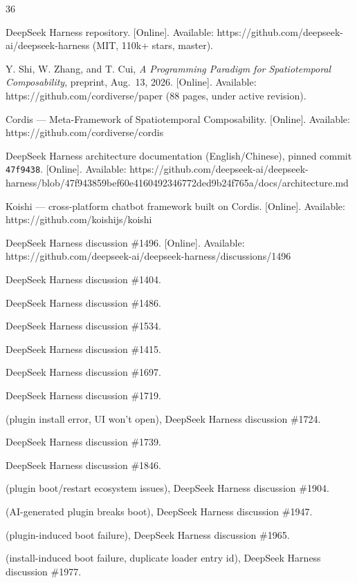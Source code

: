 \documentclass[11pt]{article}
\begin{document}
\begin{thebibliography}{36}

 DeepSeek Harness repository. [Online]. Available:
https://github.com/deepseek-ai/deepseek-harness (MIT, 110k+ stars,
master).

 Y. Shi, W. Zhang, and T. Cui, \emph{A Programming Paradigm for
Spatiotemporal Composability}, preprint, Aug.~13, 2026. [Online].
Available: https://github.com/cordiverse/paper (88 pages, under active
revision).

 Cordis --- Meta-Framework of Spatiotemporal Composability.
[Online]. Available: https://github.com/cordiverse/cordis

 DeepSeek Harness architecture documentation (English/Chinese),
pinned commit \texttt{47f9438}. [Online]. Available:
https://github.com/deepseek-ai/deepseek-harness/blob/47f943859bef60e4160492346772ded9b24f765a/docs/architecture.md

 Koishi --- cross-platform chatbot framework built on Cordis.
[Online]. Available: https://github.com/koishijs/koishi

 DeepSeek
Harness discussion \#1496. [Online]. Available:
https://github.com/deepseek-ai/deepseek-harness/discussions/1496

 DeepSeek Harness discussion
\#1404.

 DeepSeek
Harness discussion \#1486.

 DeepSeek Harness discussion \#1534.

 DeepSeek Harness discussion \#1415.

 DeepSeek Harness discussion \#1697.

 DeepSeek Harness discussion \#1719.

 (plugin install error, UI
won't open), DeepSeek Harness discussion \#1724.

 DeepSeek Harness discussion \#1739.

 DeepSeek Harness discussion \#1846.

 (plugin boot/restart
ecosystem issues), DeepSeek Harness discussion \#1904.

 (AI-generated plugin breaks boot), DeepSeek Harness discussion \#1947.

 (plugin-induced
boot failure), DeepSeek Harness discussion \#1965.

 (install-induced
boot failure, duplicate loader entry id), DeepSeek Harness discussion
\#1977.


\end{thebibliography}
\end{document}
